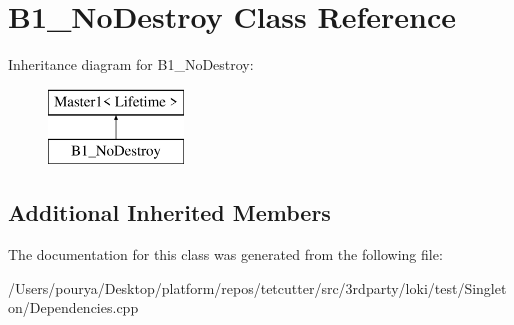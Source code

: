 \hypertarget{classB1__NoDestroy}{}\section{B1\+\_\+\+No\+Destroy Class Reference}
\label{classB1__NoDestroy}
Inheritance diagram for B1\+\_\+\+No\+Destroy\+:\begin{figure}[H]
\begin{center}
\leavevmode
\includegraphics[height=2.000000cm]{classB1__NoDestroy}
\end{center}
\end{figure}
\subsection*{Additional Inherited Members}


The documentation for this class was generated from the following file\+:\begin{DoxyCompactItemize}
\item 
/\+Users/pourya/\+Desktop/platform/repos/tetcutter/src/3rdparty/loki/test/\+Singleton/Dependencies.\+cpp\end{DoxyCompactItemize}

